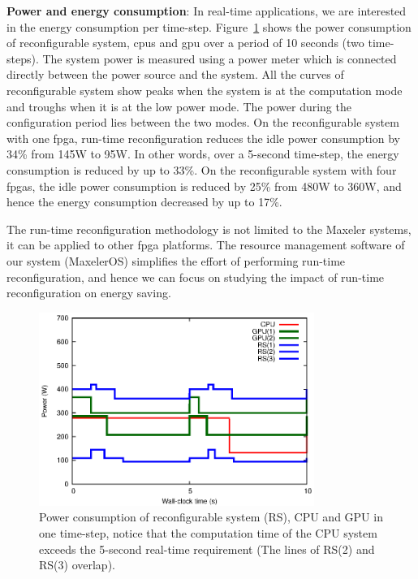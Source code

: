 \textbf{Power and energy consumption}: In real-time applications, we are interested in the energy consumption per time-step.
Figure~\ref{fig:power} shows the power consumption of reconfigurable system, \glspl{cpu} and \gls{gpu} over a period of 10 seconds (two time-steps).
The system power is measured using a power meter which is connected directly between the power source and the system.
All the curves of reconfigurable system show peaks when the system is at the computation mode and troughs when it is at the low power mode.
The power during the configuration period lies between the two modes.
On the reconfigurable system with one \gls{fpga}, run-time reconfiguration reduces the idle power consumption by 34\% from 145W to 95W.
In other words, over a 5-second time-step, the energy consumption is reduced by up to 33\%.
On the reconfigurable system with four \glspl{fpga}, the idle power consumption is reduced by 25\% from 480W to 360W, and hence the energy consumption decreased by up to 17\%.

The run-time reconfiguration methodology is not limited to the Maxeler systems, it can be applied to other \gls{fpga} platforms.
The resource management software of our system (MaxelerOS) simplifies the effort of performing run-time reconfiguration, and hence we can focus on studying the impact of run-time reconfiguration on energy saving.

\begin{figure}[t!]
\centering
\includegraphics[width=0.8\textwidth]{4_adaptation/figures/fig_power2}
\caption[Power consumption of reconfigurable system (RS), CPU and GPU in one time-step, notice that the computation time of the CPU system exceeds the 5-second real-time requirement]{Power consumption of reconfigurable system (RS), CPU and GPU in one time-step, notice that the computation time of the CPU system exceeds the 5-second real-time requirement (The lines of RS(2) and RS(3) overlap).}
\label{fig:power}
\end{figure}


